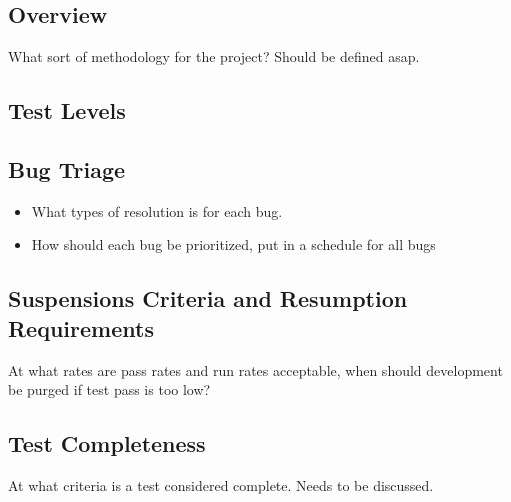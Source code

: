 \subsection{Overview}
What sort of methodology for the project? Should be defined asap. 

\subsection{Test Levels}

\subsection{Bug Triage}
\begin{itemize}
\item What types of resolution is for each bug.
\item How should each bug be prioritized, put in a schedule for all bugs
\end{itemize}

\subsection{Suspensions Criteria and Resumption Requirements}
At what rates are pass rates and run rates acceptable, when should development be purged if test pass is too low?

\subsection{Test Completeness}
At what criteria is a test considered complete. Needs to be discussed.
